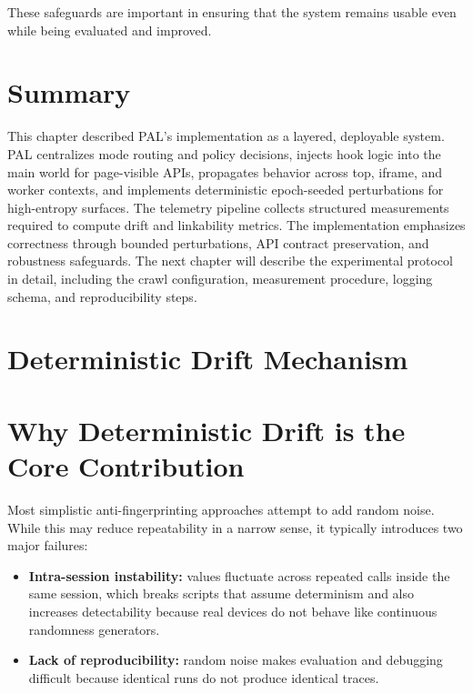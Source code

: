 \documentclass[11pt]{report}
\begin{document}
These safeguards are important in ensuring that the system remains usable even while being evaluated and improved.

\section{Summary}

This chapter described PAL’s implementation as a layered, deployable system. PAL centralizes mode routing and policy decisions, injects hook logic into the main world for page-visible APIs, propagates behavior across top, iframe, and worker contexts, and implements deterministic epoch-seeded perturbations for high-entropy surfaces. The telemetry pipeline collects structured measurements required to compute drift and linkability metrics. The implementation emphasizes correctness through bounded perturbations, API contract preservation, and robustness safeguards. The next chapter will describe the experimental protocol in detail, including the crawl configuration, measurement procedure, logging schema, and reproducibility steps.













\section{Deterministic Drift Mechanism}

\section{Why Deterministic Drift is the Core Contribution}

Most simplistic anti-fingerprinting approaches attempt to add random noise. While this may reduce repeatability in a narrow sense, it typically introduces two major failures:

\begin{itemize}
    \item \textbf{Intra-session instability:} values fluctuate across repeated calls inside the same session, which breaks scripts that assume determinism and also increases detectability because real devices do not behave like continuous randomness generators.
    \item \textbf{Lack of reproducibility:} random noise makes evaluation and debugging difficult because identical runs do not produce identical traces.
\end{itemize}
\end{document}
